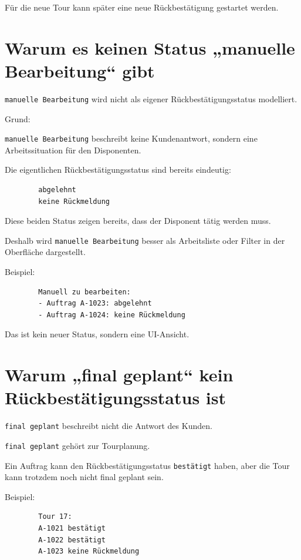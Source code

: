\documentclass[12pt,a4paper]{article}
\begin{document}
	Für die neue Tour kann später eine neue Rückbestätigung gestartet werden.
	
	\section{Warum es keinen Status „manuelle Bearbeitung“ gibt}
	
	\texttt{manuelle Bearbeitung} wird nicht als eigener Rückbestätigungsstatus modelliert.
	
	Grund:
	
	\texttt{manuelle Bearbeitung} beschreibt keine Kundenantwort, sondern eine Arbeitssituation für den Disponenten.
	
	Die eigentlichen Rückbestätigungsstatus sind bereits eindeutig:
	
	\begin{lstlisting}
		abgelehnt
		keine Rückmeldung
	\end{lstlisting}
	
	Diese beiden Status zeigen bereits, dass der Disponent tätig werden muss.
	
	Deshalb wird \texttt{manuelle Bearbeitung} besser als Arbeitsliste oder Filter in der Oberfläche dargestellt.
	
	Beispiel:
	
	\begin{lstlisting}
		Manuell zu bearbeiten:
		- Auftrag A-1023: abgelehnt
		- Auftrag A-1024: keine Rückmeldung
	\end{lstlisting}
	
	Das ist kein neuer Status, sondern eine UI-Ansicht.
	
	\section{Warum „final geplant“ kein Rückbestätigungsstatus ist}
	
	\texttt{final geplant} beschreibt nicht die Antwort des Kunden.
	
	\texttt{final geplant} gehört zur Tourplanung.
	
	Ein Auftrag kann den Rückbestätigungsstatus \texttt{bestätigt} haben, aber die Tour kann trotzdem noch nicht final geplant sein.
	
	Beispiel:
	
	\begin{lstlisting}
		Tour 17:
		A-1021 bestätigt
		A-1022 bestätigt
		A-1023 keine Rückmeldung
	\end{lstlisting}
	
\end{document}
